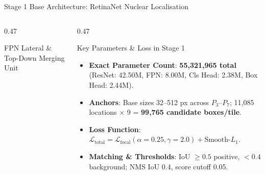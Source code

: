 \documentclass[aspectratio=169, 10pt]{beamer}
\begin{document}
\begin{frame}{Stage 1 Base Architecture: RetinaNet Nuclear Localisation}
\begin{columns}[onlytextwidth, t]
\begin{column}{0.47\textwidth}
\begin{block}{FPN Lateral \& Top-Down Merging Unit}
{{
        }
      }
    \end{block}
  \end{column}
  \hfill
  \begin{column}{0.47\textwidth}
    \begin{block}{Key Parameters \& Loss in Stage 1}
      \parbox[t][2.85cm][t]{\linewidth}{
        \begin{itemize}\scriptsize
          \item \textbf{Exact Parameter Count}: \textbf{55,321,965 total} (ResNet: 42.50M, FPN: 8.00M, Cls Head: 2.38M, Box Head: 2.44M).
          \item \textbf{Anchors}: Base sizes 32--512 px across $P_3$--$P_7$; 11,085 locations $\times$ 9 = \textbf{99,765 candidate boxes/tile}.
          \item \textbf{Loss Function}: $\mathcal{L}_{\text{total}} = \mathcal{L}_{\text{focal}} (\alpha=0.25, \gamma=2.0) + \text{Smooth-}L_1$.
          \item \textbf{Matching \& Thresholds}: IoU $\ge 0.5$ positive, $<0.4$ background; NMS IoU 0.4, score cutoff 0.05.
        \end{itemize}
      }
    \end{block}
  \end{column}
\end{columns}
\end{frame}
\end{document}
